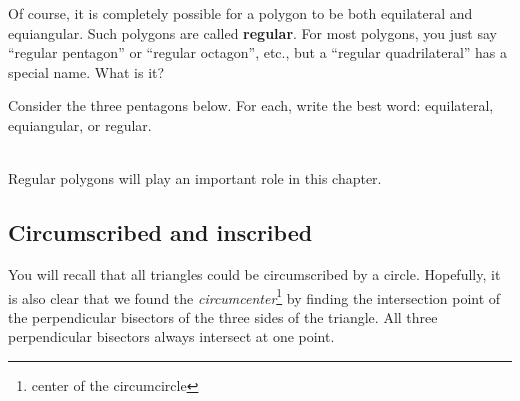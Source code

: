 \bigskip

Of course, it is completely possible for a polygon to be both equilateral and equiangular.
Such polygons are called \textbf{regular}. 
For most polygons, you just say ``regular pentagon'' or ``regular octagon'', etc.,
but a ``regular quadrilateral'' has a special name. \q What is it?

\medskip
\newpage

\noindent \q Consider the three pentagons below.  For each, write the best word: equilateral, equiangular, or regular.\\\\

	\hspace*{\fill}
	\hspace*{\fill}
	\hspace*{\fill}
	\hspace*{\fill}

\noindent Regular polygons will play an important role in this chapter.  


\subsection{Circumscribed and inscribed}

You will recall that all triangles could be circumscribed by a circle.  Hopefully, it is also clear that we found the \emph{circumcenter}\footnote{center of the circumcircle} by finding the intersection point of the perpendicular bisectors of the three sides of the triangle.  All three perpendicular bisectors always intersect at one point.\\

